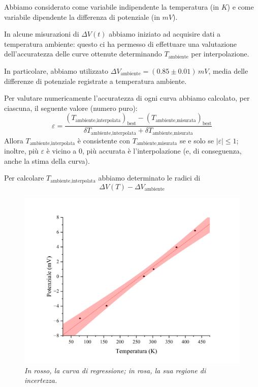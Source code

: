\documentclass{article}
\begin{document}
Abbiamo considerato come variabile indipendente la temperatura (in $\unit{K}$)
e come variabile dipendente la differenza di potenziale (in $\unit{mV}$).

In alcune misurazioni di $\Delta V(t)$ abbiamo iniziato
ad acquisire dati a temperatura ambiente: questo ci ha
permesso di effettuare una valutazione dell'accuratezza
delle curve ottenute determinando $T_\text{ambiente}$
per interpolazione.

In particolare, abbiamo utilizzato
$\Delta V_\text{ambiente} = (0.85\pm0.01)\,\unit{mV}$,
media delle differenze di potenziale registrate a temperatura
ambiente.

Per valutare numericamente l'accuratezza di ogni curva
abbiamo calcolato, per ciascuna, il seguente valore (numero puro):
\[
  \varepsilon = \frac{
    \left(T_\text{ambiente,interpolata}\right)_\text{best} -
    \left(T_\text{ambiente,misurata}\right)_\text{best}
  }{\delta T_\text{ambiente,interpolata} + \delta T_\text{ambiente,misurata}}
\]
Allora $T_\text{ambiente,interpolata}$ è consistente con
$T_\text{ambiente,misurata}$ se e solo se $\left|\varepsilon\right|\le 1$;
inoltre, più $\varepsilon$ è vicino a $0$, più accurata è l'interpolazione
(e, di conseguenza, anche la stima della curva).

Per calcolare $T_\text{ambiente,interpolata}$ abbiamo determinato le radici di
\[ \Delta V(T) - \Delta V_\text{ambiente} \]

\begin{figure}[H]
  \centering
  \includegraphics[trim={2cm 0.6cm 3cm 1cm},clip,width=\textwidth]{img/regressione1.png}
  \caption*{\emph{
    In rosso, la curva di regressione; in rosa, la sua regione di incertezza.
  }}
\end{figure}
\end{document}
